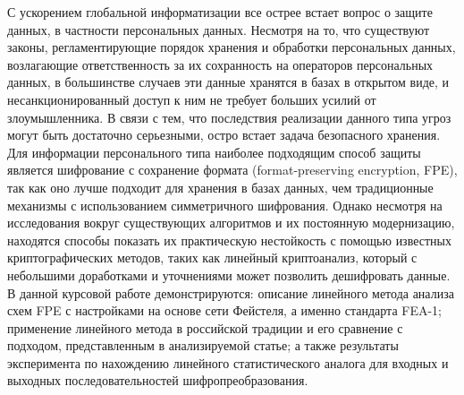 \Introduction

 С ускорением глобальной информатизации все острее встает вопрос о защите данных, в частности персональных данных. Несмотря на то, что существуют законы, регламентирующие порядок хранения и обработки персональных данных, возлагающие ответственность за их сохранность на операторов персональных данных, в большинстве случаев эти данные хранятся в базах в открытом виде, и несанкционированный доступ к ним не требует больших усилий от злоумышленника. В связи с тем, что последствия реализации данного типа угроз могут быть достаточно серьезными, остро встает задача безопасного хранения. Для информации персонального типа наиболее подходящим способ защиты является шифрование с сохранение формата (format-preserving encryption, FPE), так как оно лучше подходит для хранения в базах данных, чем традиционные механизмы с использованием симметричного шифрования. Однако несмотря на исследования вокруг существующих алгоритмов и их постоянную модернизацию, находятся способы показать их практическую нестойкость с помощью известных криптографических методов, таких как линейный криптоанализ, который с небольшими доработками и уточнениями может позволить дешифровать данные. В данной курсовой работе демонстрируются: описание линейного метода анализа схем FPE с настройками на основе сети Фейстеля, а именно стандарта FEA-1; применение линейного метода в российской традиции и его сравнение с подходом, представленным в анализируемой статье; а также результаты эксперимента по нахождению линейного статистического аналога для входных и выходных последовательностей шифропреобразования.

